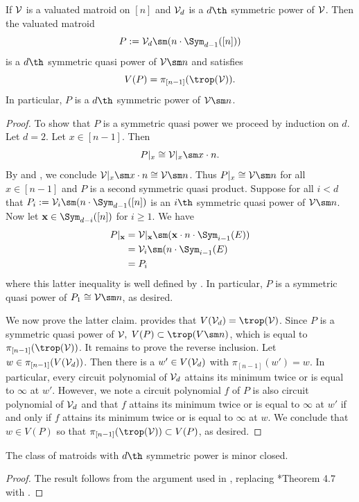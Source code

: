 \begin{lemma}\label{lem:geometricDeletion}
    If $\mathcal{V}$ is a valuated matroid on $[n]$ and $\mathcal{V}_d$ is a $d\th$ symmetric power of $\mathcal{V}$. Then the valuated matroid
    $$P:=\sV_d\sm(n\cdot \Sym_{d-1}([n]))$$
    is a $d\th$ symmetric quasi power of $\sV\sm n$ and satisfies
    $$V(P) = \pi_{[n-1]}(\trop(\sV)).$$
    In particular, $P$ is a $d\th$ symmetric power of $\sV\sm n$.
\end{lemma}
\begin{proof} 
To show that $P$ is a symmetric quasi power we proceed by induction on $d$. Let $d=2$. Let $x\in [n-1]$. Then 
$$P|_x \cong \sV|_x\sm x\cdot n.$$
By  and , we conclude $\sV|_x\sm x\cdot n \cong \sV\sm n$. Thus $P|_x\cong \sV\sm n$ for all $x\in [n-1]$ and $P$ is a second symmetric quasi product. Suppose for all $i<d$ that $P_i := \sV_i\sm (n\cdot \Sym_{d-1}([n])$ is an $i\th$ symmetric quasi power of $\sV\sm n$. Now let $\bfx \in \Sym_{d-i}([n])$ for $i\geq 1$. We have
\begin{align*}
    P|_{\bfx}   &= \sV|_{\bfx}\sm (\bfx\cdot n \cdot \Sym_{i-1}(E)) \\
                &= \sV_{i}\sm (n\cdot\Sym_{i-1}(E)\\
                &= P_i
\end{align*}
where this latter inequality is well defined by . In particular, $P$ is a symmetric quasi power of $P_1\cong \sV\sm n$, as desired. 

We now prove the latter claim.  provides that $V(\sV_d)=\trop(\sV)$. Since $P$ is a symmetric quasi power of $\mathcal{V},$ $V(P)\subset \trop(V\sm n)$, which is equal to $\pi_{[n-1]}(\trop(\sV))$. It remains to prove the reverse inclusion. Let $w\in \pi_{[n-1]}(V(\mathcal{V}_d))$. Then there is a $w' \in V(\mathcal{V}_d)$ with $\pi_{[n-1]}(w')=w$. In particular, every circuit polynomial of $\mathcal{V}_d$ attains its minimum twice or is equal to $\infty$ at $w'$. However, we note a circuit polynomial $f$ of $P$ is also circuit polynomial of $\mathcal{V}_d$ and that $f$ attains its minimum twice or is equal to $\infty$ at $w'$ if and only if $f$ attains its minimum twice or is equal to $\infty$ at $w$. We conclude that $w\in V(P)$ so that $\pi_{[n-1]}(\trop(\sV))\subset V(P)$, as desired.
\end{proof}

\begin{corollary}\label{cor:minorClosed}
    The class of matroids with $d\th$ symmetric power is minor closed.
\end{corollary}
\begin{proof}
    The result follows from the argument used in , replacing \cite{MR20}*{Theorem 4.7} with .
\end{proof}


